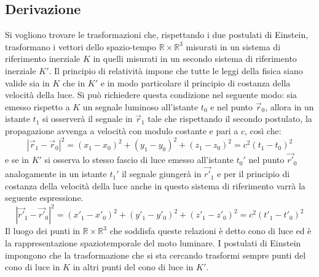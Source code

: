 \subsection{Derivazione}
\label{sec:DervTrasfLorentz}
Si vogliono trovare le trasformazioni che, rispettando i due postulati di Einstein, trasformano i vettori dello spazio-tempo $\mathbb{R}\times\mathbb{R}^3$  misurati in un sistema di riferimento inerziale $K$ in quelli misurati in un secondo sistema di riferimento inerziale $K'$. Il principio di relatività impone che tutte le leggi della fisica siano valide sia in $K$ che in $K'$ e in modo particolare il principio di costanza della velocità della luce. Si può richiedere questa condizione nel seguente modo: sia emesso rispetto a $K$ un segnale luminoso all'istante $t_0$ e nel punto $\vec{r}_0$, allora in un istante $t_1$ si osserverà il segnale in $\vec{r}_1$ tale che rispettando il secondo postulato, la propagazione avvenga a velocità con modulo costante e pari a $c$, così che:
\begin{equation}
    |\vec{r}_1-\vec{r}_0|^2=(x_1-x_0)^2+(y_1-y_0)^2+(z_1-z_0)^2=c^2(t_1-t_0)^2
    \label{luceK}
\end{equation}
e se in $K'$ si osserva lo stesso fascio di luce emesso all'istante $t_0'$ nel punto $\vec{r'}_0$ analogamente in un istante $t_1'$ il segnale giungerà in $\vec{r'}_1$ e per il principio di costanza della velocità della luce anche in questo sistema di riferimento varrà la seguente espressione.
\begin{equation}
    |\vec{r'}_1-\vec{r'}_0|^2=(x'_1-x'_0)^2+(y'_1-y'_0)^2+(z'_1-z'_0)^2=c^2(t'_1-t'_0)^2
    \label{luceK'}
\end{equation}
Il luogo dei punti in $\mathbb{R}\times\mathbb{R}^3$ che soddisfa queste relazioni è detto cono di luce ed è la rappresentazione spaziotemporale del moto luminare. I postulati di Einstein impongono che la trasformazione che si sta cercando trasformi sempre punti del cono di luce in $K$ in altri punti del cono di luce in $K'$.\\ 

